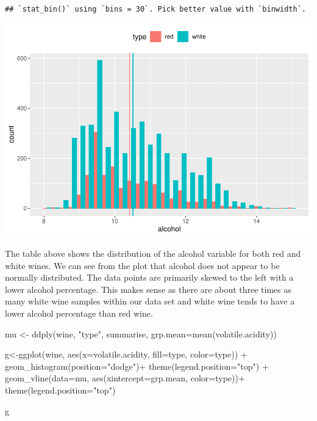 \documentclass[
]{book}
\newenvironment{Shaded}{\begin{snugshade}}{\end{snugshade}}
\newcommand{\AttributeTok}[1]{\textcolor[rgb]{0.77,0.63,0.00}{#1}}
\newcommand{\FunctionTok}[1]{\textcolor[rgb]{0.00,0.00,0.00}{#1}}
\newcommand{\NormalTok}[1]{#1}
\newcommand{\OtherTok}[1]{\textcolor[rgb]{0.56,0.35,0.01}{#1}}
\newcommand{\SpecialCharTok}[1]{\textcolor[rgb]{0.00,0.00,0.00}{#1}}
\newcommand{\StringTok}[1]{\textcolor[rgb]{0.31,0.60,0.02}{#1}}
\begin{document}
\begin{verbatim}
## `stat_bin()` using `bins = 30`. Pick better value with `binwidth`.
\end{verbatim}

\includegraphics{FinalProject-Bright-Santoro_files/figure-latex/unnamed-chunk-3-1.pdf}

The table above shows the distribution of the alcohol variable for both red and white wines. We can see from the plot that alcohol does not appear to be normally distributed. The data points are primarily skewed to the left with a lower alcohol percentage. This makes sense as there are about three times as many white wine samples within our data set and white wine tends to have a lower alcohol percentage than red wine.

\begin{Shaded}
\begin{Highlighting}[]
\NormalTok{mu }\OtherTok{\textless{}{-}} \FunctionTok{ddply}\NormalTok{(wine, }\StringTok{"type"}\NormalTok{, summarise, }\AttributeTok{grp.mean=}\FunctionTok{mean}\NormalTok{(volatile.acidity))}

\NormalTok{g}\OtherTok{\textless{}{-}}\FunctionTok{ggplot}\NormalTok{(wine, }\FunctionTok{aes}\NormalTok{(}\AttributeTok{x=}\NormalTok{volatile.acidity, }\AttributeTok{fill=}\NormalTok{type, }\AttributeTok{color=}\NormalTok{type)) }\SpecialCharTok{+}
  \FunctionTok{geom\_histogram}\NormalTok{(}\AttributeTok{position=}\StringTok{"dodge"}\NormalTok{)}\SpecialCharTok{+}
  \FunctionTok{theme}\NormalTok{(}\AttributeTok{legend.position=}\StringTok{"top"}\NormalTok{) }\SpecialCharTok{+} 
  \FunctionTok{geom\_vline}\NormalTok{(}\AttributeTok{data=}\NormalTok{mu, }\FunctionTok{aes}\NormalTok{(}\AttributeTok{xintercept=}\NormalTok{grp.mean, }\AttributeTok{color=}\NormalTok{type))}\SpecialCharTok{+}
  \FunctionTok{theme}\NormalTok{(}\AttributeTok{legend.position=}\StringTok{"top"}\NormalTok{)}

\NormalTok{g}
\end{Highlighting}
\end{Shaded}
\end{document}
